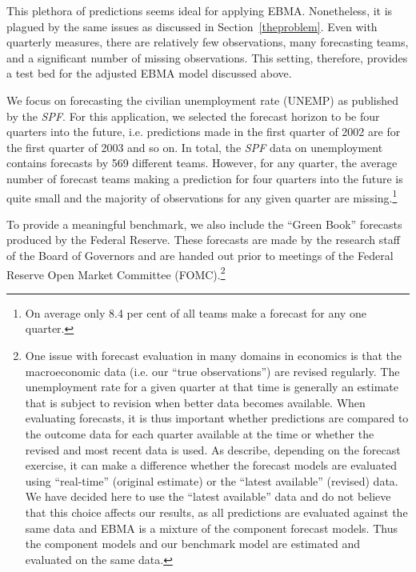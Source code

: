 \documentclass[12pt,fullpage,endnotes]{article}
\begin{document}
This plethora of predictions seems ideal for applying EBMA.
Nonetheless, it is plagued by the same issues as discussed in
Section~\ref{theproblem}.  Even with quarterly measures, there are
relatively few observations, many forecasting teams, and a significant
number of missing observations.  This setting, therefore, provides a
test bed for the adjusted EBMA model discussed above.

We focus on forecasting the civilian unemployment rate (UNEMP) as
published by the \textit{SPF}. For this application, we selected the
forecast horizon to be four quarters into the future, i.e. predictions
made in the first quarter of 2002 are for the first quarter of 2003
and so on. In total, the \textit{SPF} data on unemployment contains
forecasts by 569 different teams. However, for any quarter, the
average number of forecast teams making a prediction for four quarters
into the future is quite small and the majority of observations for
any given quarter are missing.\footnote{On average only 8.4 per cent
  of all teams make a forecast for any one quarter.}

To provide a meaningful benchmark, we also include the ``Green Book''
forecasts produced by the Federal Reserve. These forecasts are made by
the research staff of the Board of Governors and are handed out prior
to meetings of the Federal Reserve Open Market Committee
(FOMC).\footnote{One issue with forecast evaluation in many domains in
  economics is that the macroeconomic data (i.e. our ``true
  observations'') are revised regularly. The unemployment rate for a
  given quarter at that time is generally an estimate that is subject
  to revision when better data becomes available. When evaluating
  forecasts, it is thus important whether predictions are compared to
  the outcome data for each quarter available at the time or whether
  the revised and most recent data is used. As
  \citet{Croushore:Stark:2001} describe, depending on the forecast
  exercise, it can make a difference whether the forecast models are
  evaluated using ``real-time'' (original estimate) or the ``latest
  available'' (revised) data. We have decided here to use the ``latest
  available'' data and do not believe that this choice affects our results, as all predictions are evaluated against the same data
  and EBMA is a mixture of the component forecast models. Thus the
  component models and our benchmark model are estimated and evaluated
  on the same data.} %
\end{document}
